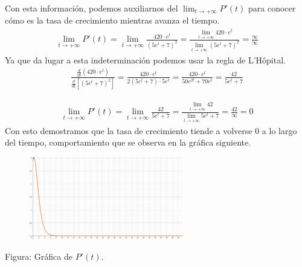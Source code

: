 \documentclass[12pt]{article}
\begin{document}
\begin{enumerate}
Con esta información, podemos auxiliarnos del  $\lim_{t \to +\infty} P'(t)$ para conocer cómo es la tasa de crecimiento mientras avanza el tiempo.\\
\[ \begin{equation*}
  \begin{split}
    \lim_{t \to +\infty} P'(t) = \lim_{t \to +\infty}   \frac {420\cdot e^{t}}{(5e^{t}+7)^{2}}  = \frac{ \lim_{t \to +\infty} 420\cdot e^{t} }{ \lim_{t \to +\infty} (5e^{t}+7)^{2}} = \frac{\infty}{\infty}
 \end{split}
\end{equation*} \]
Ya que da lugar a esta indeterminación podemos usar la regla de L'Hôpital.\\
\[ \begin{equation*}
  \begin{split}
    \frac {  \frac{d}{dt}  (420\cdot e^{t})}{  \frac{d}{dt}  \left[(5e^{t}+7)^{2}\right]}  = \frac {420\cdot e^{t}}{ 2(5e^{t}+7) \cdot 5e^{t}} =
   \frac {420\cdot e^{t}}{50e^{2t}+70e^{t}} =  \frac {42}{5e^{t}+7}
 \end{split}
\end{equation*} \]

\[ \begin{equation*}
  \begin{split}
    \lim_{t \to +\infty} P'(t) = \lim_{t \to +\infty}  \frac {42}{5e^{t}+7}  = \frac{ \lim_{t \to +\infty} 42}{ \lim_{t \to +\infty} 5e^{t}+7 } = \frac{42}{\infty} = 0
 \end{split}
\end{equation*} \]
Con esto demostramos que la tasa de crecimiento tiende a volverse 0 a lo largo del tiempo, comportamiento que se observa en la gráfica siguiente.
   \begin{figure}[H]
\centering
\includegraphics[width=0.6\textwidth]{../img/img_Lista3/tasa.png}
     \end{figure}
     Figura: Gráfica de $P'(t)$.
\end{enumerate}

\end{document}
